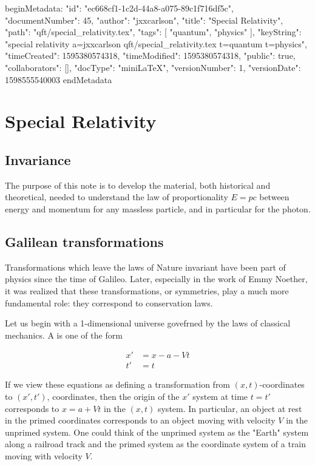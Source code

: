beginMetadata:
{
    "id": "ec668cf1-1c2d-44a8-a075-89c1f716df5c",
    "documentNumber": 45,
    "author": "jxxcarlson",
    "title": "Special Relativity",
    "path": "qft/special_relativity.tex",
    "tags": [
        "quantum",
        "physics"
    ],
    "keyString": "special relativity a=jxxcarlson qft/special_relativity.tex t=quantum t=physics",
    "timeCreated": 1595380574318,
    "timeModified": 1595380574318,
    "public": true,
    "collaborators": [],
    "docType": "miniLaTeX",
    "versionNumber": 1,
    "versionDate": 1598555540003
}
endMetadata


\setcounter{section}{13}


\section{Special Relativity}

\innertableofcontents

\subsection{Invariance}

The purpose of this note is to develop the material,
both historical and theoretical, needed to understand
the law of proportionality $E = pc$ between energy
and momentum for any massless particle, and in particular
for the photon.

\subsection{Galilean transformations}

Transformations which leave the laws of Nature
invariant have been part of physics since the time
of Galileo.  Later, especially in the work of Emmy Noether,
it was realized that these transformations,
or symmetries, play a much more fundamental role: they
correspond to conservation laws.

Let us begin with a 1-dimensional universe govefrned
by  the laws of classical mechanics.  A 
is one of the form

\begin{align}
  x' &= x - a - Vt \\
  t' &= t
\end{align}

If we view these equations as defining a transformation
from $(x,t)$-coordinates to $(x',t')$, coordinates, then the
origin of the $x'$ system at time $t = t'$ corresponds to
$x = a + Vt$ in the $(x,t)$ system.  In particular, an object
at rest in the primed coordinates corresponds to an object
moving with velocity $V$ in the unprimed system.  One
could think of the unprimed system as the "Earth" system
along a railroad track and the primed system as the 
coordinate system of a train moving with velocity $V$.

